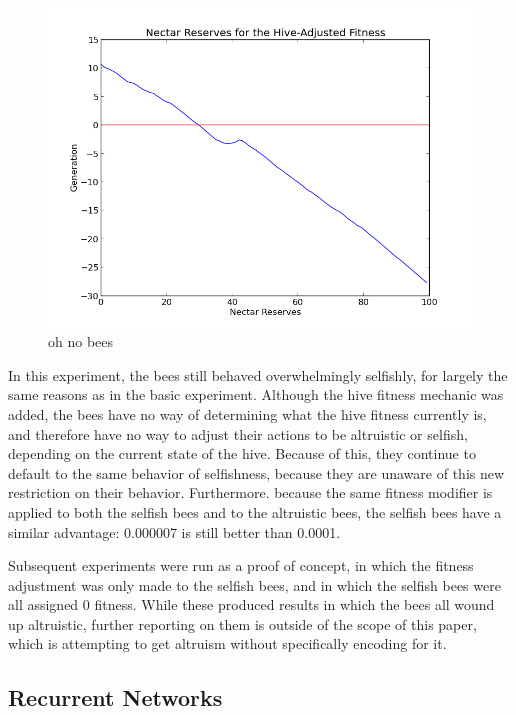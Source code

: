 \documentclass[11pt]{article}
\begin{document}
			\begin{figure}[tb]
				\begin{center}
					\includegraphics[scale=.5]{results/hive_fitness_res.png}
				\end{center}
				\caption{oh no bees}
				\label{fig:hive_fitness_reserves}
			\end{figure}

			In this experiment, the bees still behaved overwhelmingly selfishly, for largely the same reasons as in the basic experiment. Although the hive fitness mechanic was added, the bees have no way of determining what the hive fitness currently is, and therefore have no way to adjust their actions to be altruistic or selfish, depending on the current state of the hive. Because of this, they continue to default to the same behavior of selfishness, because they are unaware of this new restriction on their behavior. Furthermore. because the same fitness modifier is applied to both the selfish bees and to the altruistic bees, the selfish bees have a similar advantage: 0.000007 is still better than 0.0001.

			Subsequent experiments were run as a proof of concept, in which the fitness adjustment was only made to the selfish bees, and in which the selfish bees were all assigned 0 fitness. While these produced results in which the bees all wound up altruistic, further reporting on them is outside of the scope of this paper, which is attempting to get altruism without specifically encoding for it.


		\subsection{Recurrent Networks} %
		\label{sub:recurrent_networks}
\end{document}
